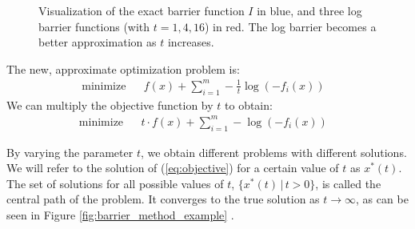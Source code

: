 \documentclass[12pt, a4paper]{report}
\begin{document}
\begin{figure}
    \centering
    \caption{Visualization of the exact barrier function $I$ in blue, and three log barrier functions (with $t=1,4,16$) in red. The log barrier becomes a better approximation as $t$ increases.}
    \label{fig:logbarrier}
\end{figure}

The new, approximate optimization problem is:
\begin{align}
    &\textrm{minimize} && f(x) + \sum_{i=1}^m -\frac{1}{t}\log(-f_i(x))&&
    \label{eq:barrierproblem}
\end{align}
We can multiply the objective function by $t$ to obtain:
\begin{align}
    &\textrm{minimize} && t \cdot f(x) + \sum_{i=1}^m -\log(-f_i(x))&&
    \label{eq:objective}
\end{align}

By varying the parameter $t$, we obtain different problems with different solutions.
We will refer to the solution of (\ref{eq:objective}) for a certain value of $t$ as $x^*(t)$.
The set of solutions for all possible values of $t$, $\{x^*(t) \,|\, t > 0\}$, is called the central path of the problem.
It converges to the true solution as $t \rightarrow \infty$, as can be seen in Figure \ref{fig:barrier_method_example} \cite[564]{boyd}.
\end{document}
